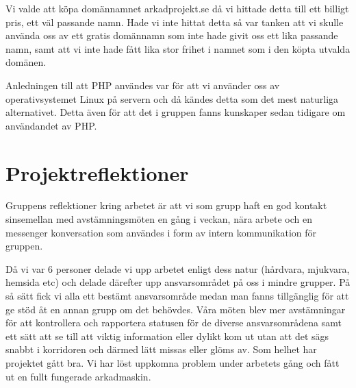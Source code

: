 \documentclass[12pt,fleqn,openany]{book} %
\begin{document}
Vi valde att köpa domännamnet arkadprojekt.se då vi hittade detta till ett billigt pris, ett väl passande namn. Hade vi inte hittat
detta så var tanken att vi skulle använda oss av ett gratis domännamn som inte hade givit oss ett lika passande namn, samt att vi inte
hade fått lika stor frihet i namnet som i den köpta utvalda domänen.  

Anledningen till att PHP användes var för att vi använder oss av operativsystemet Linux på servern och då kändes detta som det mest 
naturliga alternativet. Detta även för att det i gruppen fanns kunskaper sedan tidigare om användandet av PHP.

\chapter{Projektreflektioner}


Gruppens reflektioner kring arbetet är att vi som grupp haft en god kontakt sinsemellan med avstämningsmöten en gång i veckan, nära 
arbete och en messenger konversation som användes i form av intern kommunikation för gruppen.
\bigskip

Då vi var 6 personer delade vi upp arbetet enligt dess natur (hårdvara, mjukvara, hemsida etc) och delade därefter upp ansvarsområdet 
på oss i mindre grupper. På så sätt fick vi alla ett bestämt ansvarsområde medan man fanns tillgänglig för att ge stöd åt en annan 
grupp om det behövdes. Våra möten blev mer avstämningar för att kontrollera och rapportera statusen för de diverse ansvarsområdena 
samt ett sätt att se till att viktig information eller dylikt kom ut utan att det sägs snabbt i korridoren och därmed lätt missas 
eller glöms av. Som helhet har projektet gått bra. Vi har löst uppkomna problem under arbetets gång och fått ut en fullt fungerade arkadmaskin. 
\bigskip
\end{document}
